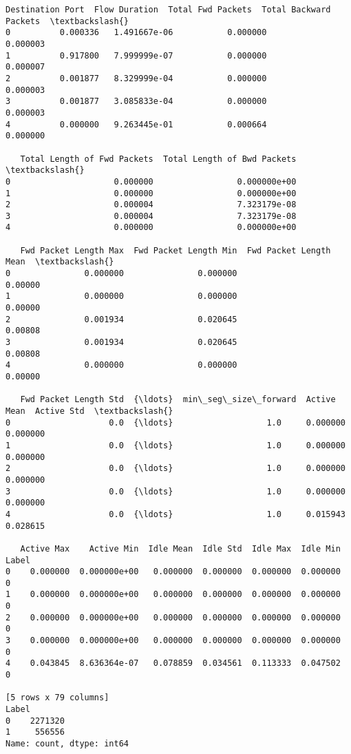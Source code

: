 \documentclass[11pt]{article}
\begin{document}
    \begin{Verbatim}[commandchars=\\\{\}]
   Destination Port  Flow Duration  Total Fwd Packets  Total Backward Packets  \textbackslash{}
0          0.000336   1.491667e-06           0.000000                0.000003
1          0.917800   7.999999e-07           0.000000                0.000007
2          0.001877   8.329999e-04           0.000000                0.000003
3          0.001877   3.085833e-04           0.000000                0.000003
4          0.000000   9.263445e-01           0.000664                0.000000

   Total Length of Fwd Packets  Total Length of Bwd Packets  \textbackslash{}
0                     0.000000                 0.000000e+00
1                     0.000000                 0.000000e+00
2                     0.000004                 7.323179e-08
3                     0.000004                 7.323179e-08
4                     0.000000                 0.000000e+00

   Fwd Packet Length Max  Fwd Packet Length Min  Fwd Packet Length Mean  \textbackslash{}
0               0.000000               0.000000                 0.00000
1               0.000000               0.000000                 0.00000
2               0.001934               0.020645                 0.00808
3               0.001934               0.020645                 0.00808
4               0.000000               0.000000                 0.00000

   Fwd Packet Length Std  {\ldots}  min\_seg\_size\_forward  Active Mean  Active Std  \textbackslash{}
0                    0.0  {\ldots}                   1.0     0.000000    0.000000
1                    0.0  {\ldots}                   1.0     0.000000    0.000000
2                    0.0  {\ldots}                   1.0     0.000000    0.000000
3                    0.0  {\ldots}                   1.0     0.000000    0.000000
4                    0.0  {\ldots}                   1.0     0.015943    0.028615

   Active Max    Active Min  Idle Mean  Idle Std  Idle Max  Idle Min  Label
0    0.000000  0.000000e+00   0.000000  0.000000  0.000000  0.000000      0
1    0.000000  0.000000e+00   0.000000  0.000000  0.000000  0.000000      0
2    0.000000  0.000000e+00   0.000000  0.000000  0.000000  0.000000      0
3    0.000000  0.000000e+00   0.000000  0.000000  0.000000  0.000000      0
4    0.043845  8.636364e-07   0.078859  0.034561  0.113333  0.047502      0

[5 rows x 79 columns]
Label
0    2271320
1     556556
Name: count, dtype: int64
    \end{Verbatim}
\end{document}
